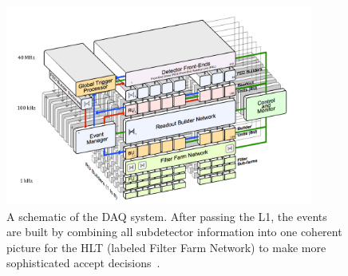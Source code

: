 \begin{figure}[hbtp]
 \begin{center}
   \includegraphics[width=0.9\textwidth]{ch3_figs/cms_daq.pdf}
   \caption[The CMS DAQ system]{A schematic of the DAQ system. After passing the L1, the events are built by combining all subdetector information into one coherent picture for the HLT (labeled Filter Farm Network) to make more sophisticated accept
     decisions~\cite{tridas}.}
   \label{fig:cms_daq}
 \end{center}
\end{figure}

%
% 
% 
